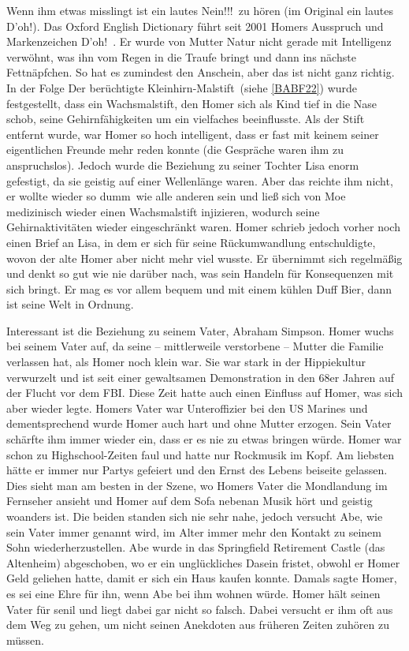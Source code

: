 Wenn ihm etwas misslingt ist ein lautes \glqq Nein!!!\grqq\ zu hören (im Original ein lautes \glqq D'oh!\grqq ). Das Oxford English Dictionary führt seit 2001 Homers Ausspruch und Markenzeichen \glqq D'oh!\grqq\ \cite{GelbRegiertDieWelt}. Er wurde von Mutter Natur nicht gerade mit Intelligenz verwöhnt, was ihn vom Regen in die Traufe bringt und dann ins nächste Fettnäpfchen. So hat es zumindest den Anschein, aber das ist nicht ganz richtig. In der Folge \glqq Der berüchtigte Kleinhirn-Malstift\grqq\ (siehe \ref{BABF22}) wurde festgestellt, dass ein Wachsmalstift, den Homer sich als Kind tief in die Nase schob, seine Gehirnfähigkeiten um ein vielfaches beeinflusste. Als der Stift entfernt wurde, war Homer so hoch intelligent, dass er fast mit keinem seiner eigentlichen Freunde mehr reden konnte (die Gespräche waren ihm zu anspruchslos). Jedoch wurde die Beziehung zu seiner Tochter Lisa enorm gefestigt, da sie geistig auf einer Wellenlänge waren. Aber das reichte ihm nicht, er wollte wieder so \glqq dumm\grqq\ wie alle anderen sein und ließ sich von Moe medizinisch wieder einen Wachsmalstift injizieren, wodurch seine Gehirnaktivitäten wieder eingeschränkt waren. Homer schrieb jedoch vorher noch einen Brief an Lisa, in dem er sich für seine Rückumwandlung entschuldigte, wovon der alte Homer aber nicht mehr viel wusste. Er übernimmt sich regelmäßig und denkt so gut wie nie darüber nach, was sein Handeln für Konsequenzen mit sich bringt. Er mag es vor allem bequem und mit einem kühlen Duff Bier, dann ist seine Welt in Ordnung.

Interessant ist die Beziehung zu seinem Vater, Abraham Simpson. Homer wuchs bei seinem Vater auf, da seine -- mittlerweile verstorbene -- Mutter die Familie verlassen hat, als Homer noch klein war. Sie war stark in der Hippiekultur verwurzelt und ist seit einer gewaltsamen Demonstration in den 68er Jahren auf der Flucht vor dem FBI. Diese Zeit hatte auch einen Einfluss auf Homer, was sich aber wieder legte. Homers Vater war Unteroffizier bei den US Marines und dementsprechend wurde Homer auch hart und ohne Mutter erzogen. Sein Vater schärfte ihm immer wieder ein, dass er es nie zu etwas bringen würde. Homer war schon zu Highschool-Zeiten faul und hatte nur Rockmusik im Kopf. Am liebsten hätte er immer nur Partys gefeiert und den Ernst des Lebens beiseite gelassen. Dies sieht man am besten in der Szene, wo Homers Vater die Mondlandung im Fernseher ansieht und Homer auf dem Sofa nebenan Musik hört und geistig woanders ist. Die beiden standen sich nie sehr nahe, jedoch versucht Abe, wie sein Vater immer genannt wird, im Alter immer mehr den Kontakt zu seinem Sohn wiederherzustellen. Abe wurde in das Springfield Retirement Castle (das Altenheim) abgeschoben, wo er ein unglückliches Dasein fristet, obwohl er Homer Geld geliehen hatte, damit er sich ein Haus kaufen konnte. Damals sagte Homer, es sei eine Ehre für ihn, wenn Abe bei ihm wohnen würde. Homer hält seinen Vater für senil und liegt dabei gar nicht so falsch. Dabei versucht er ihm oft aus dem Weg zu gehen, um nicht seinen Anekdoten aus früheren Zeiten zuhören zu müssen.


